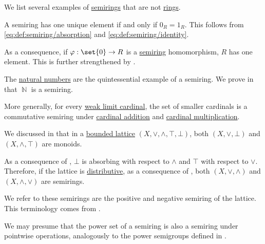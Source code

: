 \begin{example}\label{ex:def:semiring}
  We list several examples of \hyperref[def:semiring]{semirings} that are not \hyperref[def:ring]{rings}.

  \begin{thmenum}
     A semiring has one unique element if and only if \( 0_R = 1_R \). This follows from \eqref{eq:def:semiring/absorption} and \eqref{eq:def:semiring/identity}.

    As a consequence, if \( \varphi: \set{ 0 } \to R \) is a \hyperref[def:semiring/homomorphism]{semiring} homomorphism, \( R \) has one element. This is further strengthened by .

     The \hyperref[def:natural_numbers]{natural numbers} are the quintessential example of a semiring. We prove in  that \( \BbbN \) is a semiring.

     More generally, for every \hyperref[def:successor_and_limit_cardinal/weak_limit]{weak limit cardinal}, the set of smaller cardinals is a commutative semiring under \hyperref[def:cardinal_arithmetic/addition]{cardinal addition} and \hyperref[def:cardinal_arithmetic/multiplication]{cardinal multiplication}.

     We discussed in  that in a \hyperref[def:semilattice/bounded]{bounded lattice} \( (X, \vee, \wedge, \top, \bot) \), both \( (X, \vee, \bot) \) and \( (X, \wedge, \top) \) are monoids.

    As a consequence of , \( \bot \) is absorbing with respect to \( \wedge \) and \( \top \) with respect to \( \vee \). Therefore, if the lattice is \hyperref[def:semilattice/distributive_lattice]{distributive}, as a consequence of , both \( (X, \vee, \wedge) \) and \( (X, \wedge, \vee) \) are semirings.

    We refer to these semirings are the positive and negative semiring of the lattice. This terminology comes from .

     We may presume that the power set of a semiring is also a semiring under pointwise operations, analogously to the power semigroups defined in .


\end{thmenum}
\end{example}
